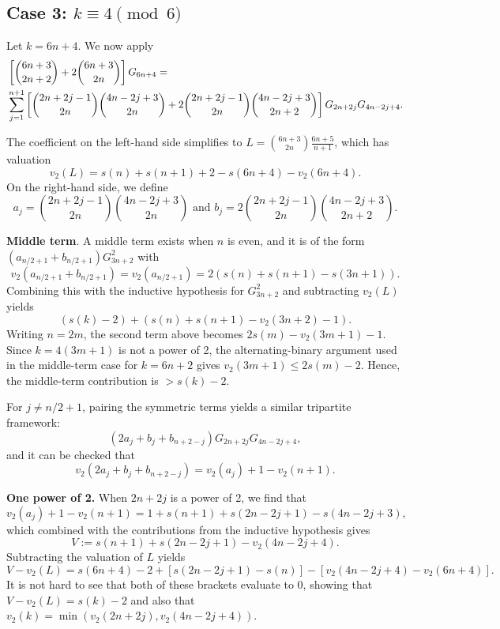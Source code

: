 \documentclass[12pt]{amsart}
\begin{document}
\subsection{Case 3: \texorpdfstring{$k \equiv 4 \pmod 6$}{k=4(mod6)}}

Let $k = 6n+4$. We now apply \cite[Theorem 3]{MerRol}
\begin{align*}
& \left[ \binom{6n+3}{2n+2} + 2\binom{6n+3}{2n} \right] G_{6n+4} = \notag \\
&\sum_{j=1}^{n+1} \left[ \binom{2n+2j-1}{2n}\binom{4n-2j+3}{2n} + 2\binom{2n+2j-1}{2n}\binom{4n-2j+3}{2n+2} \right] G_{2n+2j} G_{4n-2j+4}.
\end{align*}

The coefficient on the left-hand side simplifies to $L=\binom{6n+3}{2n} \frac{6n+5}{n+1}$, which has valuation  
\[ v_2(L) = s(n) + s(n+1) + 2 - s(6n+4) - v_2(6n+4).\]
On the right-hand side, we define
$$a_j = \binom{2n+2j-1}{2n}\binom{4n-2j+3}{2n} \text{ and } b_j = 2\binom{2n+2j-1}{2n}\binom{4n-2j+3}{2n+2}.$$ 

\bigskip

\noindent \textbf{Middle term}. A middle term exists when $n$ is even, and it is of the form $(a_{n/2+1} + b_{n/2+1})G_{3n+2}^2$ with $$v_2(a_{n/2+1} + b_{n/2+1}) = v_2(a_{n/2+1})=2\left( s(n)+s(n+1)-s(3n+1) \right).$$ Combining this with the inductive hypothesis for $G_{3n+2}^2$ and subtracting $v_2(L)$ yields
\[ (s(k)-2)+(s(n)+s(n+1)-v_2(3n+2)-1).\] Writing $n=2m$, the second term above becomes $2s(m)-v_2(3m+1)-1$. Since $k=4(3m+1)$ is not a power of 2,  the alternating-binary argument used in the middle-term case for $k=6n+2$ gives $v_2(3m+1)\le 2s(m)-2$. Hence, the middle-term contribution is $>s(k)-2$. 

\bigskip 

For $j\neq n/2+1$, pairing the symmetric terms yields a similar tripartite framework:$$(2a_j + b_j + b_{n+2-j}) G_{2n+2j} G_{4n-2j+4},$$ and it can be checked that 
\[ v_2( 2a_j + b_j + b_{n+2-j}) = v_2(a_j)+1-v_2(n+1).\]

\bigskip 

\noindent \textbf{One power of 2.}  When $2n+2j$ is a power of 2, we find that
\[ v_2(a_j)+1-v_2(n+1)= 1 + s(n+1) + s(2n-2j+1) - s(4n-2j+3),\] which combined with the contributions from the inductive hypothesis gives
\[
V :=   s(n+1) + s(2n-2j+1) - v_2(4n-2j+4).
\]
Subtracting the valuation of $L$ yields
$$V-v_2(L) = s(6n+4) - 2 + \left[ s(2n-2j+1) - s(n) \right] - \left[ v_2(4n-2j+4) - v_2(6n+4) \right].$$ It is not hard to see that both of these brackets evaluate to 0, showing that $V-v_2(L) = s(k) - 2$ and also that $v_2(k)= \min \left( v_2(2n+2j), v_2(4n-2j+4) \right).$
\end{document}
